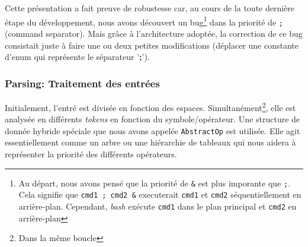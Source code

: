 \documentclass[12pt]{article}
\begin{document}


Cette présentation a fait preuve de robustesse car, au cours de la toute dernière étape du développement, nous avons découvert un bug\footnote{Au départ, nous avons pensé que la priorité de \texttt{\&} est plus imporante que \texttt{;}. Cela signifie que \texttt{cmd1 ; cmd2 \&} executerait \texttt{cmd1} et \texttt{cmd2} séquentiellement en arrière-plan. Cependant, \textit{bash} exécute \texttt{cmd1} dans le plan principal et \texttt{cmd2} en arrière-plan} dans la priorité de \texttt{;} (command separator). Mais grâce à l'architecture adoptée, la correction de ce bug consistait juste à faire une ou deux petites modifications (déplacer une constante d'enum qui représente le séparateur '\textbf{;}').


\subsubsection{Parsing: Traitement des entrées} 
Initialement, l'entré est divisée en fonction des espaces. Simultanément\footnote{Dans la même boucle}, elle est analysée en différents \textit{tokens} en fonction du symbole/opérateur. Une structure de donnée hybride spéciale que nous avons appelée \texttt{AbstractOp} est utilisée. Elle agit essentiellement comme un arbre ou une hiérarchie de tableaux qui nous aidera à représenter la priorité des différents opérateurs.
\end{document}
